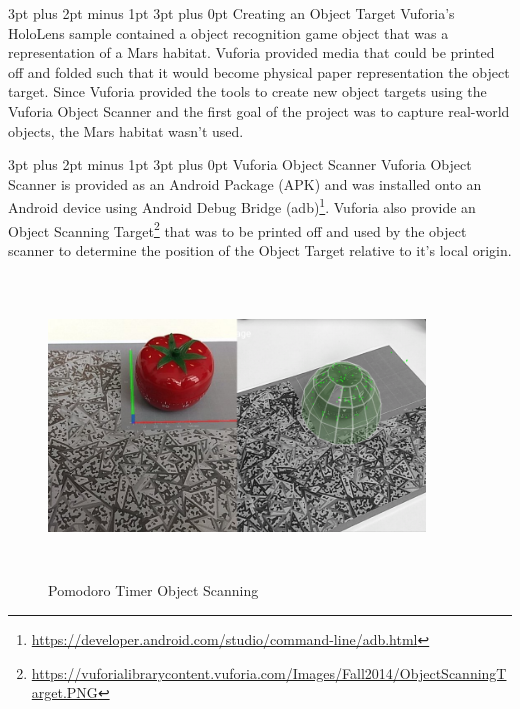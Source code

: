 \documentclass[12pt,a4paper,oneside]{article}
\makeatletter
\renewcommand\paragraph{\@startsection {paragraph}{1}{0mm} %
	                           {3pt plus 2pt minus 1pt} %
	                           {3pt plus 0pt} %
	                           {\normalfont}}
\makeatother
\begin{document}
\paragraph{Creating an Object Target}
Vuforia's HoloLens sample contained a object recognition game object that was a representation of a Mars habitat. Vuforia provided media that could be printed off and folded such that it would become physical paper representation the object target. Since Vuforia provided the tools to create new object targets using the Vuforia Object Scanner and the first goal of the project was to capture real-world objects, the Mars habitat wasn't used.

\paragraph{Vuforia Object Scanner}
Vuforia Object Scanner is provided as an Android Package (APK) and was installed onto an Android device using Android Debug Bridge (adb)\footnote{\url{https://developer.android.com/studio/command-line/adb.html}}. Vuforia also provide an Object Scanning Target\footnote{\url{https://vuforialibrarycontent.vuforia.com/Images/Fall2014/ObjectScanningTarget.PNG}} that was to be printed off and used by the object scanner to determine the position of the Object Target relative to it's local origin.

\begin{figure}[!h]
	\centering
	\includegraphics[width=10cm,height=8cm,keepaspectratio]{images/pomo}
	\caption{Pomodoro Timer Object Scanning}
	\label{fig_pomo}
\end{figure}
\end{document}
